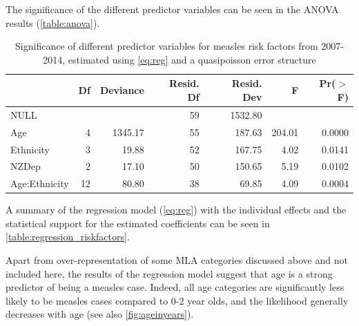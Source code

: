 \documentclass{article}
\begin{document}
The significance of the different predictor variables can be seen in the ANOVA results (\autoref{table:anova}).
\par
\vspace{5mm} %
\begin{table}
\begin{tabular}{lrrrrrr}
  \hline
 & Df & Deviance & Resid. Df & Resid. Dev & F & Pr($>$F) \\ 
  \hline
NULL &  &  & 59 & 1532.80 &  &  \\ 
  Age & 4 & 1345.17 & 55 & 187.63 & 204.01 & 0.0000 \\ 
  Ethnicity & 3 & 19.88 & 52 & 167.75 & 4.02 & 0.0141 \\ 
  NZDep & 2 & 17.10 & 50 & 150.65 & 5.19 & 0.0102 \\ 
  Age:Ethnicity & 12 & 80.80 & 38 & 69.85 & 4.09 & 0.0004 \\ 
   \hline
\end{tabular}\caption{Significance of different predictor variables for measles risk factors from 2007-2014, estimated using \autoref{eq:reg} and a quasipoisson error structure}
\label{table:anova}
\end{table}
\vspace{5mm} %

A summary of the regression model (\autoref{eq:reg}) with the individual effects and the statistical support for the estimated coefficients can be seen in \autoref{table:regression_riskfactors}.


\par Apart from over-representation of some MLA categories discussed above and not included here, the results of the regression model suggest that age is a strong predictor of being a measles case. Indeed, all age categories are significantly less likely to be measles cases compared to 0-2 year olds, and the likelihood generally decreases with age (see also \autoref{fig:ageinyears}).
\end{document}

